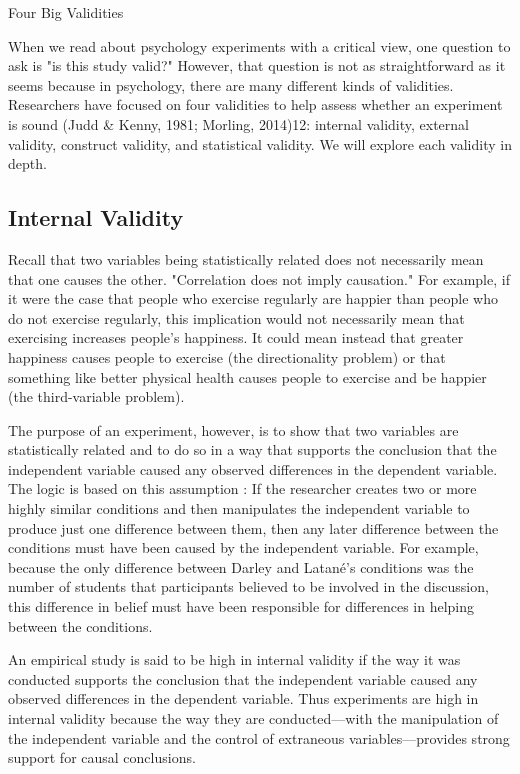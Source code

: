  Four Big Validities
 
 When we read about psychology experiments with a critical view, one question to ask is "is this study valid?" However, that question is not as straightforward as it seems because in psychology, there are many different kinds
of validities. Researchers have focused on four validities to help assess whether an experiment is sound (Judd \& Kenny, 1981; Morling, 2014)12: internal validity, external validity, construct validity, and statistical validity. We will explore each validity in depth.
 
 \subsection{Internal Validity}
 
 Recall that two variables being statistically related does not necessarily mean that one causes the other. "Correlation does not imply causation." For example, if it were the case that people who exercise regularly are happier than people who do not exercise regularly, this implication would not necessarily mean that exercising increases people's happiness. It could mean instead that greater happiness causes people to exercise (the directionality problem) or that something like better physical health causes people to exercise and be happier (the third-variable problem).
 
 The purpose of an experiment, however, is to show that two variables are statistically related and to do so in a way that supports the conclusion that the independent variable caused any observed differences in the dependent variable. The logic is based on this assumption : If the researcher creates two or more highly similar conditions and then manipulates the independent variable to produce just one difference between them, then any later difference between the conditions must have been caused by the independent variable. For example, because the only difference between Darley and Latané's conditions was the number of students that participants believed to be involved in the discussion, this difference in belief must have been responsible for differences in helping between the conditions.
 
 An empirical study is said to be high in internal validity if the way it was conducted supports the conclusion that the independent variable caused any observed differences in the dependent variable. Thus experiments are high in internal validity because the way they are conducted---with the manipulation of the independent variable and the control of extraneous variables---provides strong support for causal conclusions.
 
